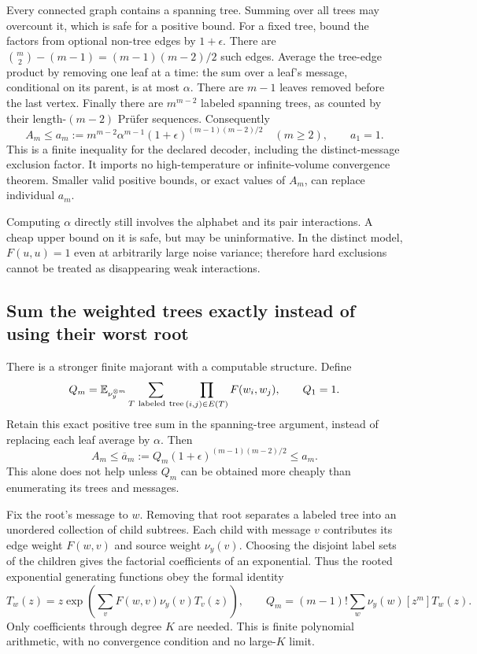 \documentclass[10pt,a4paper]{article}
\newcommand{\E}{\mathbb E}
\begin{document}
Every connected graph contains a spanning tree. Summing over all trees may overcount it, which is safe for
a positive bound. For a fixed tree, bound the factors from optional non-tree edges by $1+\epsilon$.
There are $\binom m2-(m-1)=(m-1)(m-2)/2$ such edges.
Average the tree-edge product by removing one leaf at a time: the sum over a leaf's message, conditional
on its parent, is at most $\alpha$. There are $m-1$ leaves removed before the last vertex.
Finally there are $m^{m-2}$ labeled spanning trees, as counted by their length-$(m-2)$ Pr\"ufer sequences.
Consequently
\begin{equation}
 \boxed{A_m\leq a_m:=
 m^{m-2}\alpha^{m-1}(1+\epsilon)^{(m-1)(m-2)/2}\quad(m\geq2),\qquad a_1=1.}
 \label{eq:tree-majorant}
\end{equation}
This is a finite inequality for the declared decoder, including the distinct-message exclusion factor.
It imports no high-temperature or infinite-volume convergence theorem.
Smaller valid positive bounds, or exact values of $A_m$, can replace individual $a_m$.

Computing $\alpha$ directly still involves the alphabet and its pair interactions. A cheap upper bound on it
is safe, but may be uninformative. In the distinct model, $F(u,u)=1$ even at arbitrarily large noise variance;
therefore hard exclusions cannot be treated as disappearing weak interactions.

\clearpage
\subsection{Sum the weighted trees exactly instead of using their worst root}
There is a stronger finite majorant with a computable structure. Define
\[
 Q_m=\E_{\nu_y^{\otimes m}}\sum_{T\ {\rm labeled\ tree}}\prod_{(i,j)\in E(T)}F(w_i,w_j),
 \qquad Q_1=1.
\]
Retain this exact positive tree sum in the spanning-tree argument, instead of replacing each leaf average
by $\alpha$. Then
\begin{equation}
 A_m\leq \overline a_m:=Q_m(1+\epsilon)^{(m-1)(m-2)/2}
 \leq a_m.
 \label{eq:weighted-tree-majorant}
\end{equation}
This alone does not help unless $Q_m$ can be obtained more cheaply than enumerating its trees and messages.

Fix the root's message to $w$. Removing that root separates a labeled tree into an unordered collection of
child subtrees. Each child with message $v$ contributes its edge weight $F(w,v)$ and source weight $\nu_y(v)$.
Choosing the disjoint label sets of the children gives the factorial coefficients of an exponential.
Thus the rooted exponential generating functions obey the formal identity
\begin{equation}
 T_w(z)=z\exp\!\left(\sum_v F(w,v)\nu_y(v)T_v(z)\right),\qquad
 Q_m=(m-1)!\sum_w\nu_y(w)[z^m]T_w(z).
 \label{eq:rooted-tree-series}
\end{equation}
Only coefficients through degree $K$ are needed. This is finite polynomial arithmetic, with no convergence
condition and no large-$K$ limit.
\end{document}
